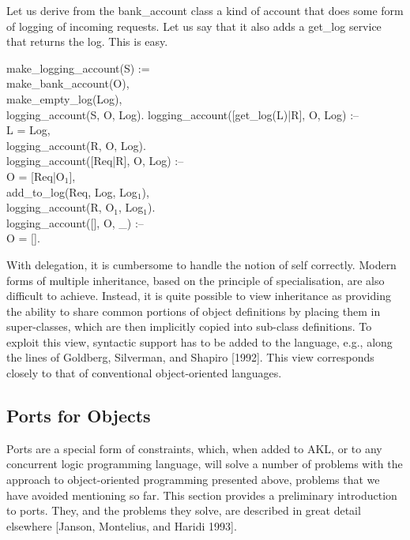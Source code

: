 Let us derive from the {\prog bank_account} class a kind of account
that does some form of logging of incoming requests.  Let us say that
it also adds a {\prog get_log} service that returns the log.  This is
easy.
%
\begin{program}
make_logging_account(S) := \\
\>\>	make_bank_account(O), \\
\>\>	make_empty_log(Log), \\
\>\>	logging_account(S, O, Log).  \nl
logging_account([get_log(L)|R], O, Log) :-- \\
\>\cond\>	L = Log, \\
\>\>	logging_account(R, O, Log).  \\
logging_account([Req|R], O, Log) :-- \\
\>\cond\>	O = [Req|O$_1$], \\
\>\>	add_to_log(Req, Log, Log$_1$), \\
\>\>	logging_account(R, O$_1$, Log$_1$).  \\
logging_account([], O, _) :-- \\
\>\cond\>	O = [].
\end{program}%
%
With delegation, it is cumbersome to handle the notion of self
correctly.  Modern forms of multiple inheritance, based on the
principle of specialisation, are also difficult to achieve.  Instead,
it is quite possible to view inheritance as providing the ability to
share common portions of object definitions by placing them in
super-classes, which are then implicitly copied into sub-class
definitions.  To exploit this view, syntactic support has to be added
to the language, e.g., along the lines of Goldberg, Silverman, and
Shapiro [1992].  This view corresponds closely to that of conventional
object-oriented languages.

\subsection{Ports for Objects}

Ports are a special form of constraints, which, when added to AKL, or
to any concurrent logic programming language, will solve a number of
problems with the approach to object-oriented programming presented
above, problems that we have avoided mentioning so far.  This section
provides a preliminary introduction to ports.  They, and the problems
they solve, are described in great detail elsewhere [Janson,
Montelius, and Haridi 1993].


